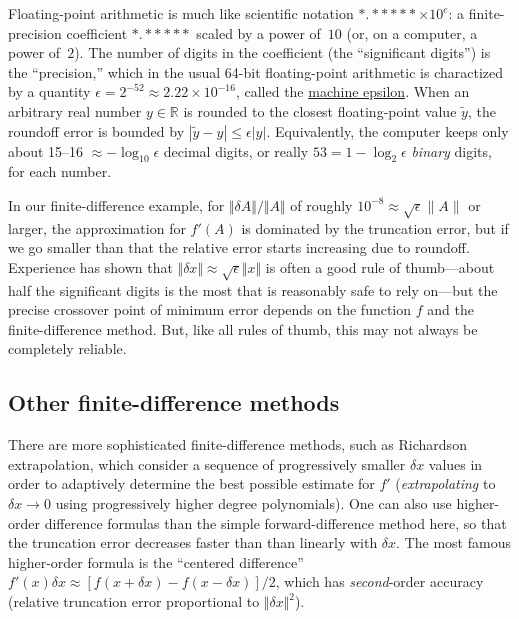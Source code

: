 Floating-point arithmetic is much like scientific notation ${*}.{*}{*}{*}{*}{*} \times 10^e$: a finite-precision coefficient ${*}.{*}{*}{*}{*}{*}$ scaled by a power of~$10$ (or, on a computer, a power of~$2$). The number of digits in the coefficient (the ``significant digits'') is the ``precision,'' which in the usual 64-bit floating-point arithmetic is charactized by a quantity $\epsilon = 2^{-52} \approx 2.22 \times 10^{-16}$, called the \href{https://en.wikipedia.org/wiki/Machine_epsilon}{machine epsilon}.  When an arbitrary real number $y \in \mathbb{R}$ is rounded to the closest floating-point value $\tilde{y}$, the roundoff error is bounded by $|\tilde{y} - y| \le \epsilon |y|$.  Equivalently, the computer keeps only about 15--16 $\approx -\log_{10} \epsilon$ decimal digits, or really $53 = 1 - \log_2 \epsilon$ \emph{binary} digits, for each number. 

In our finite-difference example, for $\Vert \delta A \Vert / \Vert A \Vert$ of roughly $10^{-8} \approx \sqrt{\epsilon} \lVert A\rVert$ or larger, the approximation for $f'(A)$ is dominated by the truncation error, but if we go smaller than that the relative error starts increasing due to roundoff. Experience has shown that $\Vert \delta x \Vert \approx \sqrt{\epsilon} \Vert x \Vert $ is often a good rule of thumb---about half the significant digits is the most that is reasonably safe to rely on---but the precise crossover point of minimum error depends on the function $f$ and the finite-difference method. But, like all rules of thumb, this may not always be completely reliable.

\subsection{Other finite-difference methods}

There are more sophisticated finite-difference methods, such as Richardson extrapolation, which consider a sequence of progressively smaller $\delta x$ values in order to adaptively determine the best possible estimate for $f'$ (\emph{extrapolating} to $\delta x \to 0$ using progressively higher degree polynomials).   One can also use higher-order difference formulas than the simple forward-difference method here, so that the truncation error decreases faster than than linearly with $\delta x$.  The most famous higher-order formula is the ``centered difference'' $f'(x) \delta x \approx [f(x + \delta x) - f(x - \delta x)]/2$, which has \emph{second}-order accuracy (relative truncation error proportional to $\Vert \delta x\Vert^2$).  


